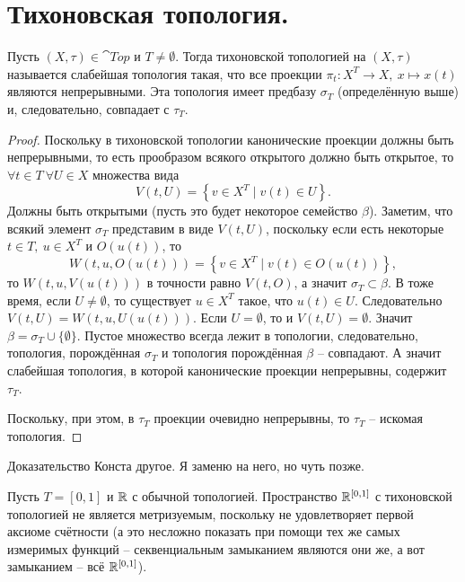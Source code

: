 \section{Тихоновская топология.}
\begin{theoremdefinition}
    Пусть $(X, \tau) \in \cat{Top}$ и $T \neq \emptyset$.
    Тогда тихоновской топологией на $(X, \tau)$ называется слабейшая топология такая, что все проекции $\pi_t\colon X^T \to X, \ x \mapsto x(t)$ являются непрерывными.
    Эта топология имеет предбазу $\sigma_T$ (определённую выше) и, следовательно, совпадает с $\tau_T$.
\end{theoremdefinition}
\begin{proof}
    Поскольку в тихоновской топологии канонические проекции должны быть непрерывными, то есть прообразом всякого открытого должно быть открытое, то $\forall t \in T \ \forall U \in X$ множества вида
    \[
        V(t, U) = \left\{v \in X^T \mid v(t) \in U\right\}.
    \]
    Должны быть открытыми (пусть это будет некоторое семейство $\beta$).
    Заметим, что всякий элемент $\sigma_T$ представим в виде $V(t, U)$, поскольку если есть некоторые $t \in T, \ u \in X^T$ и $O(u(t))$, то
    \[
        W(t, u, O(u(t))) = \left\{v \in X^T \mid v(t) \in O(u(t)) \right\},
    \]
    то $W(t, u, V(u(t)))$ в точности равно $V(t, O)$, а значит $\sigma_T \subset \beta$.
    В тоже время, если $U \neq \emptyset$, то существует $u \in X^T$ такое, что $u(t) \in U$.
    Следовательно $V(t, U) = W(t, u, U(u(t)))$.
    Если $U = \emptyset$, то и $V(t, U) = \emptyset$.
    Значит $\beta = \sigma_T \cup \{\emptyset\}$.
    Пустое множество всегда лежит в топологии, следовательно, топология, порождённая $\sigma_T$ и топология порождённая $\beta$ -- совпадают.
    А значит слабейшая топология, в которой канонические проекции непрерывны, содержит $\tau_T$.

    Поскольку, при этом, в $\tau_T$ проекции очевидно непрерывны, то $\tau_T$ -- искомая топология.
\end{proof}
\begin{notet}
    Доказательство Конста другое.
    Я заменю на него, но чуть позже.
\end{notet}
\begin{example}
    Пусть $T = [0, 1]$ и $\mathbb{R}$ с обычной топологией.
    Пространство $\mathbb{R}^{[0, 1]}$ с тихоновской топологией не является метризуемым, поскольку не удовлетворяет первой аксиоме счётности (а это несложно показать при помощи тех же самых измеримых функций -- секвенциальным замыканием являются они же, а вот замыканием -- всё $\mathbb{R}^{[0, 1]}$).
\end{example}

